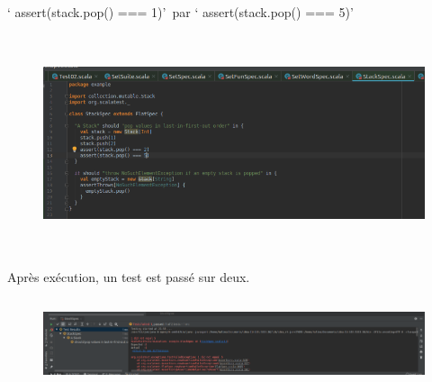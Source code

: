 \documentclass[12pt]{article}
\begin{document}
\begin{justify}
 ‘ assert(stack.pop() === 1)’\  par ‘ assert(stack.pop() === 5)’ 
\end{justify}\par




\begin{figure}[H]
	\begin{Center}
		\includegraphics[width=6.3in,height=2.52in]{./media/image28.png}
	\end{Center}
\end{figure}



\par

\begin{justify}
Après exécution, un test est passé sur deux.
\end{justify}\par




\begin{figure}[H]
	\begin{Center}
		\includegraphics[width=6.3in,height=1.03in]{./media/image29.png}
	\end{Center}
\end{figure}
\end{document}
